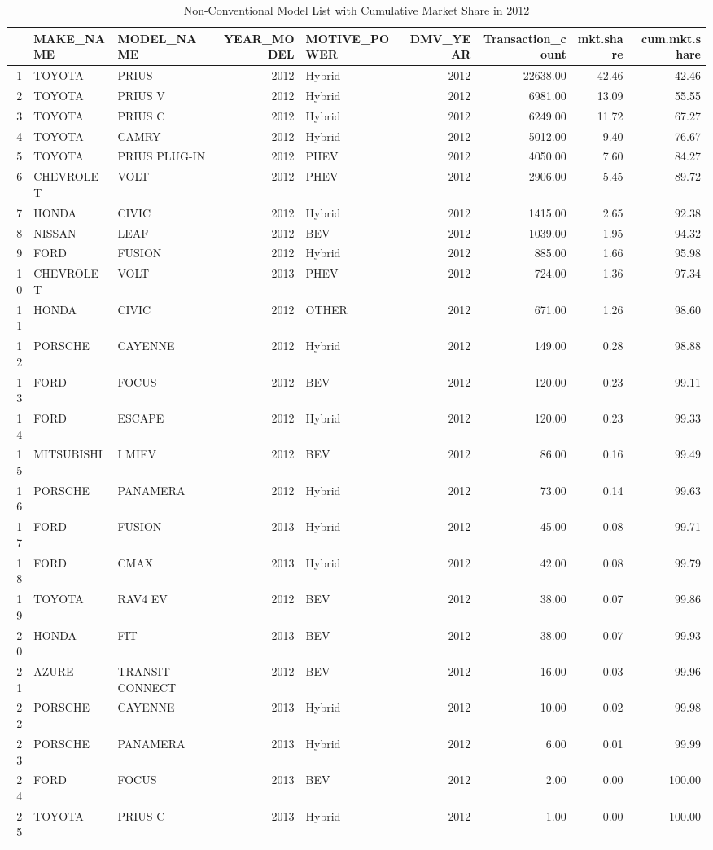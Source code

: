 \begin{longtable}{rllrlrrrr}
\caption{Non-Conventional Model 
                                       List with Cumulative Market Share in 2012} \\ 
  \hline
 & MAKE\_NAME & MODEL\_NAME & YEAR\_MODEL & MOTIVE\_POWER & DMV\_YEAR & Transaction\_count & mkt.share & cum.mkt.share \\ 
  \hline
1 & TOYOTA & PRIUS & 2012 & Hybrid & 2012 & 22638.00 & 42.46 & 42.46 \\ 
  2 & TOYOTA & PRIUS V & 2012 & Hybrid & 2012 & 6981.00 & 13.09 & 55.55 \\ 
  3 & TOYOTA & PRIUS C & 2012 & Hybrid & 2012 & 6249.00 & 11.72 & 67.27 \\ 
  4 & TOYOTA & CAMRY & 2012 & Hybrid & 2012 & 5012.00 & 9.40 & 76.67 \\ 
  5 & TOYOTA & PRIUS PLUG-IN & 2012 & PHEV & 2012 & 4050.00 & 7.60 & 84.27 \\ 
  6 & CHEVROLET & VOLT & 2012 & PHEV & 2012 & 2906.00 & 5.45 & 89.72 \\ 
  7 & HONDA & CIVIC & 2012 & Hybrid & 2012 & 1415.00 & 2.65 & 92.38 \\ 
  8 & NISSAN & LEAF & 2012 & BEV & 2012 & 1039.00 & 1.95 & 94.32 \\ 
  9 & FORD & FUSION & 2012 & Hybrid & 2012 & 885.00 & 1.66 & 95.98 \\ 
  10 & CHEVROLET & VOLT & 2013 & PHEV & 2012 & 724.00 & 1.36 & 97.34 \\ 
  11 & HONDA & CIVIC & 2012 & OTHER & 2012 & 671.00 & 1.26 & 98.60 \\ 
  12 & PORSCHE & CAYENNE & 2012 & Hybrid & 2012 & 149.00 & 0.28 & 98.88 \\ 
  13 & FORD & FOCUS & 2012 & BEV & 2012 & 120.00 & 0.23 & 99.11 \\ 
  14 & FORD & ESCAPE & 2012 & Hybrid & 2012 & 120.00 & 0.23 & 99.33 \\ 
  15 & MITSUBISHI & I MIEV & 2012 & BEV & 2012 & 86.00 & 0.16 & 99.49 \\ 
  16 & PORSCHE & PANAMERA & 2012 & Hybrid & 2012 & 73.00 & 0.14 & 99.63 \\ 
  17 & FORD & FUSION & 2013 & Hybrid & 2012 & 45.00 & 0.08 & 99.71 \\ 
  18 & FORD & CMAX & 2013 & Hybrid & 2012 & 42.00 & 0.08 & 99.79 \\ 
  19 & TOYOTA & RAV4 EV & 2012 & BEV & 2012 & 38.00 & 0.07 & 99.86 \\ 
  20 & HONDA & FIT & 2013 & BEV & 2012 & 38.00 & 0.07 & 99.93 \\ 
  21 & AZURE & TRANSIT CONNECT & 2012 & BEV & 2012 & 16.00 & 0.03 & 99.96 \\ 
  22 & PORSCHE & CAYENNE & 2013 & Hybrid & 2012 & 10.00 & 0.02 & 99.98 \\ 
  23 & PORSCHE & PANAMERA & 2013 & Hybrid & 2012 & 6.00 & 0.01 & 99.99 \\ 
  24 & FORD & FOCUS & 2013 & BEV & 2012 & 2.00 & 0.00 & 100.00 \\ 
  25 & TOYOTA & PRIUS C & 2013 & Hybrid & 2012 & 1.00 & 0.00 & 100.00 \\ 
   \hline
\hline
\end{longtable}
